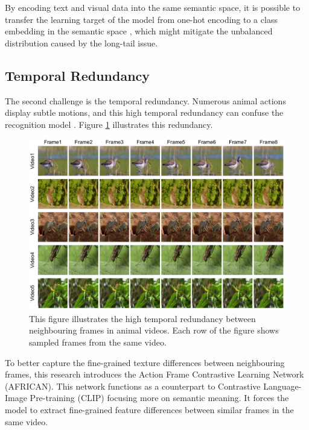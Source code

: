 By encoding text and visual data into the same semantic space, it is possible to transfer the learning target of the model from one-hot encoding to a class embedding in the semantic space \parencite{ma2022x}, which might mitigate the unbalanced distribution caused by the long-tail issue. 


\subsection{Temporal Redundancy}
The second challenge is the temporal redundancy. Numerous animal actions display subtle motions, and this high temporal redundancy can confuse the recognition model \parencite{YUAN2018221, li2022uniformer}. Figure \ref{fig:1_3_FrameComparison} illustrates this redundancy. 

\begin{figure}[ht]
    \centering
    \includegraphics[width=1\textwidth]{assets/charts/1_3_FrameComparison}
    \caption[Temporal Redundancy]{This figure illustrates the high temporal redundancy between neighbouring frames in animal videos. Each row of the figure shows sampled frames from the same video.}
    \label{fig:1_3_FrameComparison}
\end{figure}

To better capture the fine-grained texture differences between neighbouring frames, this research introduces the Action Frame Contrastive Learning Network (AFRICAN). This network functions as a counterpart to Contrastive Language-Image Pre-training (CLIP) \parencite{radford2021learning} focusing more on semantic meaning. It forces the model to extract fine-grained feature differences between similar frames in the same video. 


